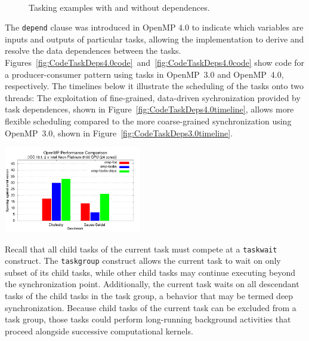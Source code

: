 \begin{figure}
~
~
\caption{Tasking examples with and without dependences.\label{fig:CodeTaskDeps}}
\end{figure}


The \texttt{depend} clause was introduced in OpenMP 4.0 to indicate which variables are inputs and outputs of particular tasks, allowing the implementation to derive and resolve the data dependences between the tasks.  Figures~\ref{fig:CodeTaskDeps4.0code}~and~\ref{fig:CodeTaskDeps4.0code} show code for a producer-consumer pattern using tasks in OpenMP~3.0 and OpenMP~4.0, respectively.  The timelines below it illustrate the scheduling of the tasks onto two threads:  The exploitation of fine-grained, data-driven sychronization provided by task dependences, shown in Figure~\ref{fig:CodeTaskDeps4.0timeline}, allows more flexible scheduling compared to the more coarse-grained synchronization using OpenMP~3.0, shown in Figure~\ref{fig:CodeTaskDeps3.0timeline}.

\includegraphics[width=0.45\textwidth]{pics/task-perf-results.png}


Recall that all child tasks of the current task must compete at a \texttt{taskwait} construct.  The \texttt{taskgroup} construct allows the current task to wait on only subset of its child tasks, while other child tasks may continue executing beyond the synchronization point.  Additionally, the current task waits on all descendant tasks of the child tasks in the task group, a behavior that may be termed deep synchronization.  Because child tasks of the current task can be excluded from a task group, those tasks could perform long-running background activities that proceed alongside successive computational kernels.


